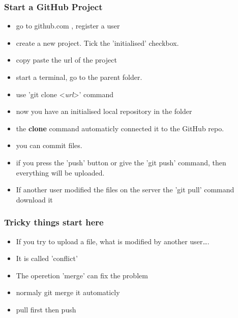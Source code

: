 \documentclass[aspectratio=169]{beamer}
\begin{document}
\begin{frame}
\frametitle<presentation>{Start a GitHub Project}



\begin{itemize}
\item go to github.com , register a user
\item create a new project. Tick the 'initialised' checkbox.
\item copy paste the url of the project  
\item start a terminal, go to the parent folder.
\item use 'git clone <\textit{url}>' command 
\end{itemize}

\pause

\begin{itemize}
\item now you have an initialised local repository in the folder
\item the \textbf{clone} command automaticly connected it to the GitHub repo.

\item you can commit files.  
\item if you press the 'push' button or give the 'git push' command, then everything will be uploaded.
\item If another user modified the files on the server the  'git pull' command download it 
\end{itemize}


\end{frame}



\begin{frame}
\frametitle<presentation>{Tricky things start here}



\begin{itemize}
\item If you try to upload a file, what is modified by another user\ldots.
\pause
\item It is called 'conflict'
\item The operetion 'merge' can fix the problem  
\item normaly git merge it automaticly
\item pull first then push 
\end{itemize}


 
\end{frame}
\end{document}
